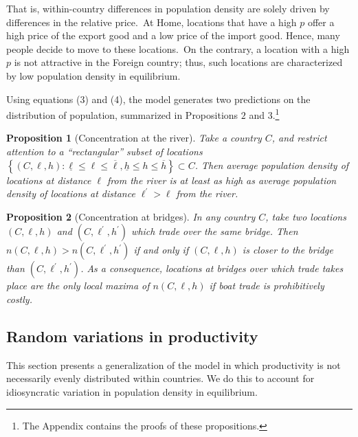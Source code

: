 \documentclass[12pt]{article}
\newtheorem{proposition}{Proposition}
\begin{document}
That is, within-country differences in population density are solely
driven by differences in the relative price.\ At Home, locations that have a
high $p$ offer a high price of the export good and a low price of the import
good. Hence, many people decide to move to these locations.\ On the
contrary, a location with a high $p$ is not attractive in the Foreign
country; thus, such locations are characterized by low population density in
equilibrium.

Using equations (3) and (4), the model generates two predictions on the
distribution of population, summarized in Propositions $2$ and $3$.\footnote{%
The Appendix contains the proofs of these propositions.}

\begin{proposition}[Concentration at the river]
Take a country $C$, and restrict attention to a ``rectangular'' subset of
locations $\left \{ \left( C,\ell ,h\right) :\underline{\ell }\leq \ell \leq 
\overline{\ell },\underline{h}\leq h\leq \overline{h}\right \} \subset C$.
Then average population density of locations at distance $\ell $ from the
river is at least as high as average population density of locations at
distance $\ell ^{\prime }>\ell $ from the river.
\end{proposition}

\begin{proposition}[Concentration at bridges]
In any country $C$, take two locations $\left( C,\ell ,h\right) $ and $%
\left( C,\ell ^{\prime },h^{\prime }\right) $ which trade over the same
bridge. Then $n\left( C,\ell ,h\right) >n\left( C,\ell ^{\prime },h^{\prime
}\right) $ if and only if $\left( C,\ell ,h\right) $ is closer to the bridge
than $\left( C,\ell ^{\prime },h^{\prime }\right) $. As a consequence,
locations at bridges over which trade takes place are the only local maxima
of $n\left( C,\ell ,h\right) $ if boat trade is prohibitively costly.
\end{proposition}

\subsection{Random variations in productivity}

This section presents a generalization of the model in which productivity is
not necessarily evenly distributed within countries. We do this to account for idiosyncratic variation in population density in equilibrium.
\end{document}
